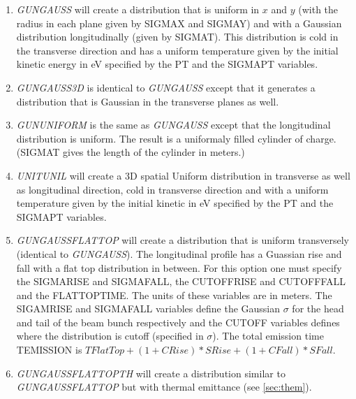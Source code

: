 \begin{enumerate}
\item {\it GUNGAUSS} will create a distribution that is uniform in $x$ and $y$ (with the
radius in each plane given by SIGMAX and SIGMAY) and with a Gaussian distribution longitudinally (given by SIGMAT).
This distribution is cold in the transverse direction and has a uniform temperature given by the initial kinetic energy in
eV specified by the PT and the SIGMAPT variables.
\item {\it GUNGAUSS3D} is identical to {\it GUNGAUSS} except that it generates a distribution that is Gaussian in the
transverse planes as well.
\item {\it GUNUNIFORM} is the same as {\it GUNGAUSS} except that the longitudinal distribution is uniform. The result is a
uniformaly filled cylinder of charge. (SIGMAT gives the length of the cylinder in meters.)
\item {\it UNITUNIL} will create a 3D spatial Uniform distribution in transverse as well as longitudinal direction, cold
in transverse direction and with a uniform temperature given by the initial kinetic in eV specified by the PT and the SIGMAPT variables.
\item {\it GUNGAUSSFLATTOP} will create a distribution that is uniform transversely (identical to {\it GUNGAUSS}). The longitudinal profile
has a Guassian rise and fall with a flat top distribution in between. For this option one must specify the SIGMARISE and SIGMAFALL, the CUTOFFRISE and CUTOFFFALL and the
FLATTOPTIME. The units of these variables are in meters. The SIGAMRISE and SIGMAFALL variables define the Gaussian $\sigma$ for the
head and tail of the beam bunch respectively and the CUTOFF variables defines where the distribution is cutoff (specified in $\sigma$). The total emission time TEMISSION is $TFlatTop + (1+CRise) * SRise + (1+CFall) * SFall$.
\item {\it GUNGAUSSFLATTOPTH} will create a distribution similar to  {\it GUNGAUSSFLATTOP}  but with thermal emittance (see \ref{sec:them}). 

\end{enumerate}

